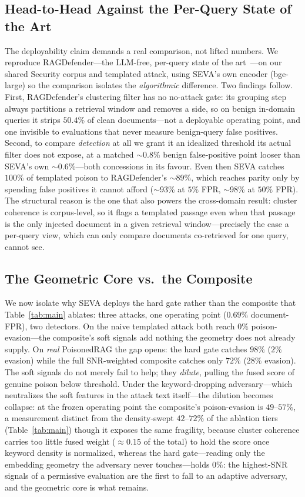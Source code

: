 \documentclass[conference]{IEEEtran}
\begin{document}
\subsection{Head-to-Head Against the Per-Query State of the Art}
\label{subsec:h2h}
The deployability claim demands a real comparison, not lifted numbers. We reproduce
RAGDefender---the LLM-free, per-query state of the art~\cite{ragdefender}---on our shared
Security corpus and templated attack, using SEVA's own encoder (bge-large) so the comparison
isolates the \emph{algorithmic} difference. Two findings follow. First,
RAGDefender's clustering filter has no no-attack gate: its grouping step always partitions a
retrieval window and removes a side, so on benign in-domain queries it strips $50.4\%$ of clean
documents---not a deployable operating point, and one invisible to evaluations that never
measure benign-query false positives. Second, to compare \emph{detection} at all we grant it an
idealized threshold its actual filter does not expose, at a matched $\sim$0.8\% benign
false-positive point looser than SEVA's own $\sim$0.6\%---both concessions in its favour. Even
then SEVA catches $100\%$ of templated poison to RAGDefender's $\sim$89\%, which reaches parity
only by spending false positives it cannot afford ($\sim$93\% at $5\%$ FPR, $\sim$98\% at
$50\%$ FPR).
The structural reason is the one that also powers the cross-domain result: cluster
coherence is corpus-level, so it flags a templated passage even when that passage
is the only injected document in a given retrieval window---precisely the case a
per-query view, which can only compare documents co-retrieved for one query, cannot
see.

\subsection{The Geometric Core vs.\ the Composite}
\label{subsec:core}
We now isolate why SEVA deploys the hard gate rather than the
composite that Table~\ref{tab:main} ablates: three attacks, one operating point
($0.69\%$ document-FPR), two detectors. On the naive templated attack both reach
$0\%$ poison-evasion---the composite's soft signals add nothing the geometry does not
already supply. On \emph{real} PoisonedRAG the gap opens: the hard gate catches $98\%$
($2\%$ evasion) while the full SNR-weighted composite catches only $72\%$ ($28\%$ evasion).
The soft signals do not merely fail to help; they \emph{dilute}, pulling the fused
score of genuine poison below threshold.
Under the keyword-dropping adversary---which neutralizes the soft features in the attack
text itself---the dilution becomes collapse: at the frozen operating point the composite's
poison-evasion is $49$--$57\%$, a measurement distinct from the
density-swept $42$--$72\%$ of the ablation tiers (Table~\ref{tab:main}) though it exposes the
same fragility, because cluster coherence carries too little fused weight
($\approx\!0.15$ of the total) to hold the score once keyword density is normalized,
whereas the hard gate---reading only the embedding geometry the adversary never
touches---holds $0\%$: the highest-SNR signals of a permissive evaluation are the
first to fall to an adaptive adversary, and the geometric core is what remains.
\end{document}
